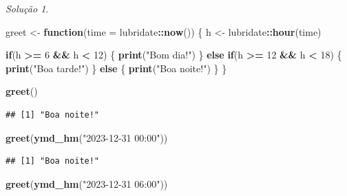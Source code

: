 \documentclass[
]{latex/krantz}
\newenvironment{Shaded}{\begin{snugshade}}{\end{snugshade}}
\newcommand{\AttributeTok}[1]{\textcolor[rgb]{0.13,0.29,0.53}{#1}}
\newcommand{\ControlFlowTok}[1]{\textcolor[rgb]{0.13,0.29,0.53}{\textbf{#1}}}
\newcommand{\DecValTok}[1]{\textcolor[rgb]{0.00,0.00,0.81}{#1}}
\newcommand{\FunctionTok}[1]{\textcolor[rgb]{0.13,0.29,0.53}{\textbf{#1}}}
\newcommand{\NormalTok}[1]{#1}
\newcommand{\OtherTok}[1]{\textcolor[rgb]{0.56,0.35,0.01}{#1}}
\newcommand{\SpecialCharTok}[1]{\textcolor[rgb]{0.81,0.36,0.00}{\textbf{#1}}}
\newcommand{\StringTok}[1]{\textcolor[rgb]{0.31,0.60,0.02}{#1}}
\theoremstyle{definition}
\theoremstyle{definition}
\theoremstyle{definition}
\theoremstyle{definition}
\theoremstyle{remark}
\newtheorem*{solution}{Solução}
\begin{document}
\begin{solution}
\leavevmode

\begin{Shaded}
\begin{Highlighting}[]
\NormalTok{greet }\OtherTok{\textless{}{-}} \ControlFlowTok{function}\NormalTok{(}\AttributeTok{time =}\NormalTok{ lubridate}\SpecialCharTok{::}\FunctionTok{now}\NormalTok{()) \{}
\NormalTok{  h }\OtherTok{\textless{}{-}}\NormalTok{ lubridate}\SpecialCharTok{::}\FunctionTok{hour}\NormalTok{(time)}
  
  \ControlFlowTok{if}\NormalTok{(h }\SpecialCharTok{\textgreater{}=} \DecValTok{6} \SpecialCharTok{\&\&}\NormalTok{ h }\SpecialCharTok{\textless{}} \DecValTok{12}\NormalTok{) \{}
    \FunctionTok{print}\NormalTok{(}\StringTok{"Bom dia!"}\NormalTok{)}
\NormalTok{  \} }\ControlFlowTok{else} \ControlFlowTok{if}\NormalTok{(h }\SpecialCharTok{\textgreater{}=} \DecValTok{12} \SpecialCharTok{\&\&}\NormalTok{ h }\SpecialCharTok{\textless{}} \DecValTok{18}\NormalTok{) \{}
    \FunctionTok{print}\NormalTok{(}\StringTok{"Boa tarde!"}\NormalTok{)}
\NormalTok{  \} }\ControlFlowTok{else}\NormalTok{ \{}
    \FunctionTok{print}\NormalTok{(}\StringTok{"Boa noite!"}\NormalTok{)}
\NormalTok{  \}}
\NormalTok{\}}

\FunctionTok{greet}\NormalTok{()}
\end{Highlighting}
\end{Shaded}

\begin{verbatim}
## [1] "Boa noite!"
\end{verbatim}

\begin{Shaded}
\begin{Highlighting}[]
\FunctionTok{greet}\NormalTok{(}\FunctionTok{ymd\_hm}\NormalTok{(}\StringTok{"2023{-}12{-}31 00:00"}\NormalTok{))}
\end{Highlighting}
\end{Shaded}

\begin{verbatim}
## [1] "Boa noite!"
\end{verbatim}

\begin{Shaded}
\begin{Highlighting}[]
\FunctionTok{greet}\NormalTok{(}\FunctionTok{ymd\_hm}\NormalTok{(}\StringTok{"2023{-}12{-}31 06:00"}\NormalTok{))}
\end{Highlighting}
\end{Shaded}


\end{solution}
\end{document}

